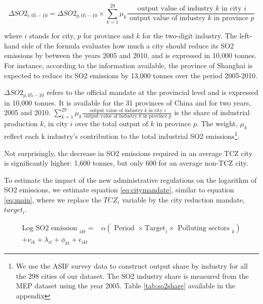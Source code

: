 \documentclass[12pt]{article}
\begin{document}
\begin{equation} \label{eq:mandate}
\Delta SO2_{i, 05 − 10}=\Delta SO2_{p, 05 − 10} \times \sum_{k=1}^{29} \mu_{k} \frac{\text { output value of industry } k \text { in city } i}{\text { output value of industry } k \text { in province } p}
\end{equation}

where $i$ stands for city, $p$ for province and $k$ for the two-digit industry. The left-hand side of the formula evaluates how much a city should reduce its SO2 emissions by between the years 2005 and 2010, and is expressed in 10,000 tonnes. For instance, according to the information available, the province of Shanghai is expected to reduce its SO2 emissions by 13,000 tonnes over the period 2005-2010.

$\Delta SO2_{p, 05 − 10}$ refers to the official mandate at the provincial level and is expressed in 10,000 tonnes. It is available for the 31 provinces of China and for two years, 2005 and 2010. $\sum_{k=1}^{29} \mu_{k} \frac{\text { output value of industry } k \text { in city } i}{\text { output value of industry } k \text { in province } p}$ is the share of industrial production $k$, in city $i$ over the total output of $k$ in province $p$. The weight, $\mu_{k}$ reflect each k industry's contribution to the total industrial SO2 emissions\footnote{We use the ASIF survey data to construct output share by industry for all the 298 cities of our dataset. The SO2 industry share is measured from the MEP dataset using the year 2005. Table \ref{tab:so2share} available in the appendix}. 

Not surprisingly, the decrease in SO2 emissions required in an average TCZ city is significantly higher: 1,600 tonnes, but only 600 for an average non-TCZ city. 

To estimate the impact of the new administrative regulations on the logarithm of SO2 emissions, we estimate equation \ref{eq:citymandate}, similar to equation \ref{eq:main}, where we replace the $TCZ_i$ variable by the city reduction mandate, $target_i$. 

\begin{equation} \label{eq:citymandate}
\begin{aligned} 
\text {Log SO2 emission }_{i k t}=& \alpha  (\text { Period }  \times \text{Target}_i \times \text {  Polluting sectors }_{k}) \\ + \nu_{ik}+\lambda_{it} +\phi_{kt} +\epsilon_{ikt}  
\end{aligned}
\end{equation}
\end{document}
